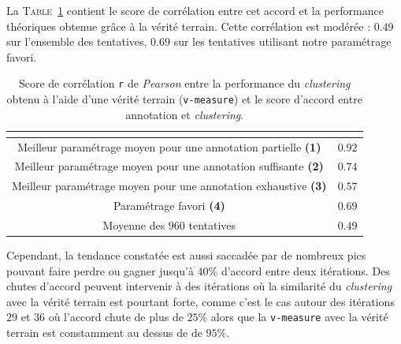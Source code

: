 			La \textsc{Table~\ref{table:4.5.1-ETUDE-RENTABILITE-CORRELATION-ACCORD-PERFORMANCE}} contient le score de corrélation entre cet accord et la performance théoriques obtenue grâce à la vérité terrain.
			Cette corrélation est modérée : $0.49$ sur l'ensemble des tentatives, $0.69$ sur les tentatives utilisant notre paramétrage favori.
			\begin{table}[!htb]
				\begin{center}
				\begin{tabular}{|c|r|}
				
					\hline
					\rowcolor{colorTableHeader!15}
					\multicolumn{1}{|c|}{\shortstack[c]{
						Paramétrage
					}}
						& \multicolumn{1}{c|}{\shortstack[c]{
							Corrélation \texttt{r}
						}}
						\tabularnewline
						\hline \hline
					
					Meilleur paramétrage moyen pour une annotation partielle \textbf{(1)}
						& $0.92$
						\tabularnewline
						\hline
					
					Meilleur paramétrage moyen pour une annotation suffisante \textbf{(2)}
						& $0.74$
						\tabularnewline
						\hline
					
					Meilleur paramétrage moyen pour une annotation exhaustive \textbf{(3)}
						& $0.57$
						\tabularnewline
						\hline
					
					Paramétrage favori \textbf{(4)}
						& $0.69$
						\tabularnewline
						\hline
					
					Moyenne des $960$ tentatives
						& $0.49$
						\tabularnewline
						\hline
					
				\end{tabular}
				\end{center}
				\caption{
					Score de corrélation \texttt{r} de \textit{Pearson} entre la performance du \textit{clustering} obtenu à l'aide d'une vérité terrain (\texttt{v-measure}) et le score d'accord entre annotation et \textit{clustering}.
				}
				\label{table:4.5.1-ETUDE-RENTABILITE-CORRELATION-ACCORD-PERFORMANCE}
			\end{table}
			
			Cependant, la tendance constatée est aussi saccadée par de nombreux pics pouvant faire perdre ou gagner jusqu'à $40$\% d'accord entre deux itérations.
			Des chutes d'accord peuvent intervenir à des itérations où la similarité du \textit{clustering} avec la vérité terrain est pourtant forte, comme c'est le cas autour des itérations $29$ et $36$ où l'accord chute de plus de $25$\% alors que la \texttt{v-measure} avec la vérité terrain est constamment au dessus de de $95$\%.
			
